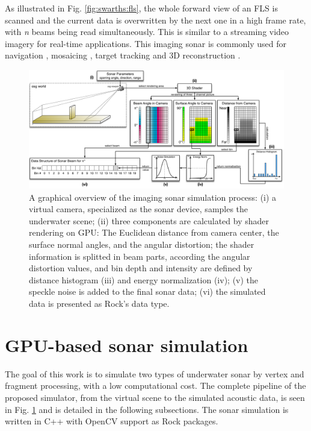 \documentclass[final,5p,times]{elsarticle}
\begin{document}
As illustrated in Fig. \ref{fig:swarths:fls}, the whole forward view of an FLS is scanned and the current data is overwritten by the next one in a high frame rate, with \textit{n} beams being read simultaneously. This is similar to a streaming video imagery for real-time applications. This imaging sonar is commonly used for navigation \cite{fallon2013}, mosaicing \cite{hurtos2014}, target tracking \cite{liu2016} and 3D reconstruction \cite{huang2015}.


\begin{figure}[t]
    \includegraphics[width=0.85\paperwidth]{figs/sonar_sim}
    \centering
    \captionsetup{justification=centering}
    \caption{A graphical overview of the imaging sonar simulation process: (i) a virtual camera, specialized as the sonar device, samples the underwater scene; (ii) three components are calculated by shader rendering on GPU: The Euclidean distance from camera center, the surface normal angles, and the angular distortion; the shader information is splitted in beam parts, according the angular distortion values, and bin depth and intensity are defined by distance histogram (iii) and energy normalization (iv); (v) the speckle noise is added to the final sonar data; (vi) the simulated data is presented as Rock's data type.}
    \label{fig:sonar_sim}
\end{figure}



\section{GPU-based sonar simulation}
\label{dev}

The goal of this work is to simulate two types of underwater sonar by vertex and fragment processing, with a low computational cost. The complete pipeline of the proposed simulator, from the virtual scene to the simulated acoustic data, is seen in Fig. \ref{fig:sonar_sim} and is detailed in the following subsections. The sonar simulation is written in C++ with OpenCV \cite{bradski2000} support as Rock packages.
\end{document}
